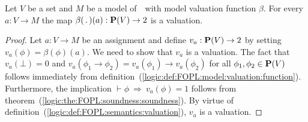 \begin{theorem}\label{logic:the:FOPL:soundness:soundness:2}
Let $V$ be a set and $M$ be a model of\, \pv\ with model valuation
function $\beta$. For every $a:V\to M$ the map
$\beta(\,.\,)(a):\mbox{${\bf P}(V)$}\to 2$ is a valuation.
\end{theorem}
\begin{proof}
Let $a:V\to M$ be an assignment and define $v_{a}:\mbox{${\bf P}(V)$}\to 2$ by
setting $v_{a}(\phi)=\beta(\phi)(a)$. We need to show that $v_{a}$
is a valuation. The fact that $v_{a}(\bot)=0$ and
$v_{a}(\phi_{1}\to\phi_{2})=v_{a}(\phi_{1})\to v_{a}(\phi_{2})$ for
all $\phi_{1},\phi_{2}\in\mbox{${\bf P}(V)$}$ follows immediately from
definition~(\ref{logic:def:FOPL:model:valuation:function}).
Furthermore, the implication $\vdash\phi\ \Rightarrow\
v_{a}(\phi)=1$ follows from
theorem~(\ref{logic:the:FOPL:soundness:soundness}). By virtue of
definition~(\ref{logic:def:FOPL:semantics:valuation}), $v_{a}$ is a
valuation.
\end{proof}
